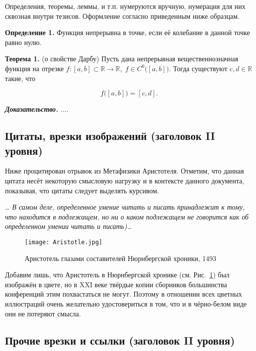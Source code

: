 \documentclass{math-mech-sci}
\begin{document}
Определения, теоремы, леммы, и т.п. нумеруются вручную, нумерация для них сквозная внутри тезисов. Оформление согласно приведенным ниже образцам.

\textbf{Определение 1.} Функция непрерывна в точке, если её колебание в данной точке равно нулю.

\textbf{Теорема 1.} (о свойстве Дарбу) Пусть дана непрерывная вещественнозначная функция на отрезке 
$f:[a,b]\subset \mathbb {R} \to \mathbb {R} ,\;f\in C^{0}{\bigl (}[a,b]{\bigr )}$. Тогда существуют
$ c,d\in \mathbb {R}$ такие, что

\begin{equation*}
	f{\bigl (}[a,b]{\bigr )}=[c,d].
\end{equation*}

\emph{\textbf{Доказательство.}} ....
	
	
\subsection{Цитаты, врезки изображений (заголовок II уровня)}

Ниже процитирован отрывок из Метафизики Аристотеля. Отметим, что
данная цитата несёт некоторую смысловую нагрузку и в контексте данного
документа, показывая, что цитаты следует выделять курсивом.

\emph{\ldots{} В самом деле, определенное умение читать и писать
  принадлежит к тому, что находится в подлежащем, но ни о каком
  подлежащем не говорится как об определенном умении читать и
  писать)\ldots}

\begin{figure}[h]
\begin{center}
\texttt{[image: Aristotle.jpg]}
\end{center}
\caption{Аристотель глазами составителей Нюрнбергской хроники,
  1493}\label{fig:aristotle}
\end{figure}

Добавим лишь, что Аристотель в Нюрнбергской хронике
(см. Рис.~\ref{fig:aristotle}) был изображён в цвете, но в XXI веке
твёрдые копии сборников большинства конференций этим похвастаться не
могут. Поэтому в отношении всех цветных иллюстраций очень желательно
удостовериться в том, что и в чёрно-белом виде они не потеряют смысла.

\subsection{Прочие врезки и ссылки (заголовок II уровня)}
\end{document}
